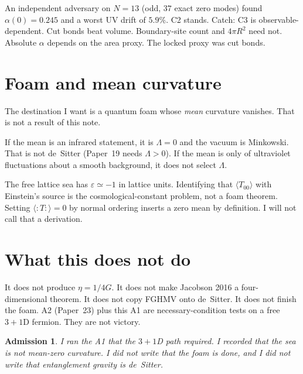 \documentclass[11pt]{article}
\newtheorem*{admission}{Admission}
\begin{document}
An independent adversary on $N=13$ (odd, $37$ exact zero modes)
found $\alpha(0)=0.245$ and a worst UV drift of $5.9\%$. C2
stands. Catch: C3 is observable-dependent. Cut bonds beat volume.
Boundary-site count and $4\pi R^2$ need not. Absolute $\alpha$
depends on the area proxy. The locked proxy was cut bonds.

\section{Foam and mean curvature}

The destination I want is a quantum foam whose \emph{mean}
curvature vanishes. That is not a result of this note.

If the mean is an infrared statement, it is $\Lambda=0$ and the
vacuum is Minkowski. That is not de~Sitter (Paper~19 needs
$\Lambda>0$). If the mean is only of ultraviolet fluctuations
about a smooth background, it does not select $\Lambda$.

The free lattice sea has $\varepsilon\simeq -1$ in lattice units.
Identifying that $\langle T_{00}\rangle$ with Einstein's source is
the cosmological-constant problem, not a foam theorem. Setting
$\langle{:T:}\rangle=0$ by normal ordering inserts a zero mean
by definition. I will not call that a derivation.

\section{What this does not do}

It does not produce $\eta=1/4G$. It does not make Jacobson 2016 a
four-dimensional theorem. It does not copy FGHMV onto de~Sitter.
It does not finish the foam. A2 (Paper~23) plus this A1 are
necessary-condition tests on a free $3{+}1$D fermion. They are
not victory.

\begin{admission}
I ran the A1 that the $3{+}1$D path required. I recorded that the
sea is not mean-zero curvature. I did not write that the foam is
done, and I did not write that entanglement gravity is de~Sitter.
\end{admission}
\end{document}
